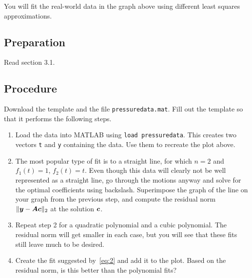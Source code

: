 \documentclass[11pt,twoside]{article}
\begin{document}
You will fit the real-world data in the graph above using different least squares approximations.

\subsection*{Preparation}

Read section 3.1. 

\subsection*{Procedure}

Download the template and the file \texttt{pressuredata.mat}. Fill out the template so that it performs the following steps. 

\begin{enumerate}
\item Load the data into MATLAB using \texttt{load pressuredata}. This creates two vectors \texttt{t} and \texttt{y} containing the data. Use them to recreate the plot above.

\item The most popular type of fit is to a straight line, for which  $n=2$ and $f_1(t)=1$, $f_2(t)=t$. Even though this data will clearly not be well represented as a straight line, go through the motions anyway and solve for the optimal coefficients using backslash. Superimpose the graph of the line on your graph from the previous step, and compute the residual norm $\|\bm{y}-\bm{A}\bm{c}\|_2$ at the solution $\bm{c}$.

\item Repeat step 2 for a quadratic polynomial and a cubic polynomial. The residual norm will get smaller in each case, but you will see that these fits still leave much to be desired.

\item Create the fit suggested by~\eqref{eq:2} and add it to the plot. Based on the residual norm, is this better than the polynomial fits? 
  
\end{enumerate}
\end{document}
